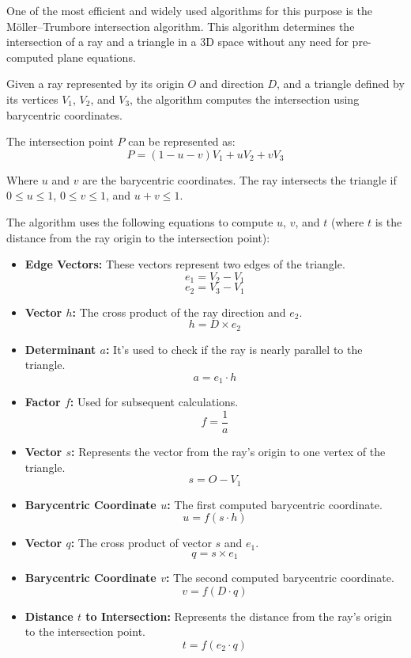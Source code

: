 \documentclass[11pt, a4paper,oneside,chapterprefix=false]{scrbook}
\begin{document}
One of the most efficient and widely used algorithms for this purpose is the Möller–Trumbore intersection algorithm. This algorithm determines the intersection of a ray and a triangle in a 3D space without any need for pre-computed plane equations.

Given a ray represented by its origin \( O \) and direction \( D \), and a triangle defined by its vertices \( V_1 \), \( V_2 \), and \( V_3 \), the algorithm computes the intersection using barycentric coordinates.

The intersection point \( P \) can be represented as:
\[ P = (1 - u - v) V_1 + u V_2 + v V_3 \]

Where \( u \) and \( v \) are the barycentric coordinates. The ray intersects the triangle if \( 0 \leq u \leq 1 \), \( 0 \leq v \leq 1 \), and \( u + v \leq 1 \).

The algorithm uses the following equations to compute \( u \), \( v \), and \( t \) (where \( t \) is the distance from the ray origin to the intersection point):

\begin{itemize}
    \item \textbf{Edge Vectors:} These vectors represent two edges of the triangle.
	\[ e_1 = V_2 - V_1 \]
	\[ e_2 = V_3 - V_1 \]
	
    \item \textbf{Vector \( h \):} The cross product of the ray direction and \( e_2 \).
    \[ h = D \times e_2 \]
    
    \item \textbf{Determinant \( a \):} It's used to check if the ray is nearly parallel to the triangle.
    \[ a = e_1 \cdot h \]
    
    \item \textbf{Factor \( f \):} Used for subsequent calculations.
    \[ f = \frac{1}{a} \]
    
    \item \textbf{Vector \( s \):} Represents the vector from the ray's origin to one vertex of the triangle.
    \[ s = O - V_1 \]
    
    \item \textbf{Barycentric Coordinate \( u \):} The first computed barycentric coordinate.
    \[ u = f (s \cdot h) \]
    
    \item \textbf{Vector \( q \):} The cross product of vector \( s \) and \( e_1 \).
    \[ q = s \times e_1 \]
    
    \item \textbf{Barycentric Coordinate \( v \):} The second computed barycentric coordinate.
    \[ v = f (D \cdot q) \]
    
    \item \textbf{Distance \( t \) to Intersection:} Represents the distance from the ray's origin to the intersection point.
    \[ t = f (e_2 \cdot q) \]
\end{itemize}
\end{document}

